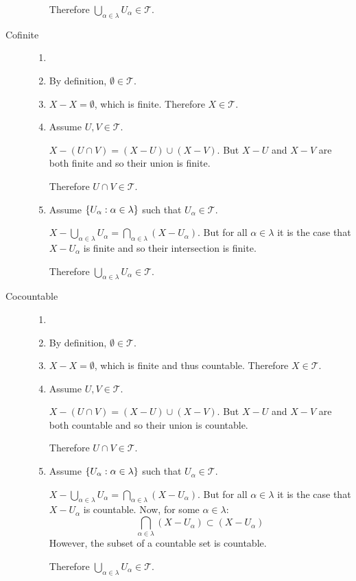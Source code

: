 \documentclass[letterpaper,12pt,fleqn]{article}
\newcommand{\T}{\mathscr{T}}
\renewcommand{\a}{\alpha}
\renewcommand{\l}{\lambda}
\begin{document}
\begin{example}
\begin{description}
\begin{enumerate}
      Therefore \(\bigcup_{\a\in\l}U_{\a}\in\T\).
    \end{enumerate}

  \item[Cofinite]
    \begin{enumerate}
    \item[]
    \item By definition, \(\emptyset\in\T\).

    \item \(X-X=\emptyset\), which is finite.  Therefore \(X\in\T\).

    \item Assume \(U,V\in\T\).

      \(X-(U\cap V)=(X-U)\cup(X-V)\).  But \(X-U\) and \(X-V\) are both finite and so their union is finite.

      Therefore \(U\cap V\in\T\).

    \item Assume \(\set{U_{\a}:\a\in\l}\) such that \(U_{\a}\in\T\).

      \(X-\bigcup_{\a\in\l}U_{\a}=\bigcap_{\a\in\l}(X-U_{\a})\).  But for all \(\a\in\l\) it is the case that
      \(X-U_{\a}\) is finite and so their intersection is finite.

      Therefore \(\bigcup_{\a\in\l}U_{\a}\in\T\).
    \end{enumerate}

  \item[Cocountable]
    \begin{enumerate}
    \item[]
    \item By definition, \(\emptyset\in\T\).

    \item \(X-X=\emptyset\), which is finite and thus countable.  Therefore \(X\in\T\).

    \item Assume \(U,V\in\T\).

      \(X-(U\cap V)=(X-U)\cup(X-V)\).  But \(X-U\) and \(X-V\) are both countable and so their union is countable.

      Therefore \(U\cap V\in\T\).

    \item Assume \(\set{U_{\a}:\a\in\l}\) such that \(U_{\a}\in\T\).

      \(X-\bigcup_{\a\in\l}U_{\a}=\bigcap_{\a\in\l}(X-U_{\a})\).  But for all \(\a\in\l\) it is the case that
      \(X-U_{\a}\) is countable.  Now, for some \(\a\in\l\):
      \[\bigcap_{\a\in\l}(X-U_{\a})\subset(X-U_{\a})\]
      However, the subset of a countable set is countable.

      Therefore \(\bigcup_{\a\in\l}U_{\a}\in\T\).
    \end{enumerate}
  \end{description}
\end{example}
\end{document}
